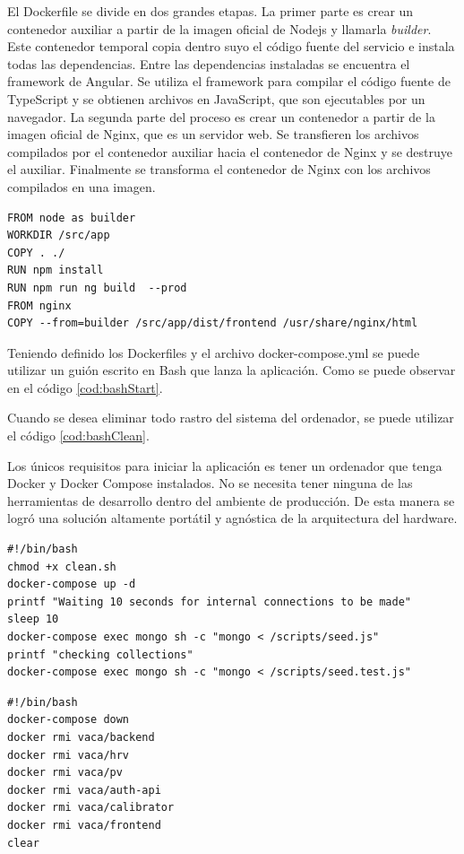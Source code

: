 El Dockerfile se divide en dos grandes etapas.
La primer parte es crear un contenedor auxiliar a partir de la imagen oficial de Nodejs y llamarla \emph{builder}.
Este contenedor temporal copia dentro suyo el código fuente del servicio e instala todas las dependencias.
Entre las dependencias instaladas se encuentra el framework de Angular.
Se utiliza el framework para compilar el código fuente de TypeScript y se obtienen archivos en JavaScript, que son ejecutables por un navegador.
La segunda parte del proceso es crear un contenedor a partir de la imagen oficial de Nginx, que es un servidor web.
Se transfieren los archivos compilados por el contenedor auxiliar hacia el contenedor de Nginx y se destruye el auxiliar.
Finalmente se transforma el contenedor de Nginx con los archivos compilados en una imagen.

\begin{lstlisting}[label=cod:dfFrontend,caption=Dockerfile del servicio Frontend.]
FROM node as builder
WORKDIR /src/app
COPY . ./
RUN npm install
RUN npm run ng build  --prod
FROM nginx
COPY --from=builder /src/app/dist/frontend /usr/share/nginx/html
\end{lstlisting}

Teniendo definido los Dockerfiles y el archivo docker-compose.yml se puede utilizar un guión escrito en Bash que lanza la aplicación.
Como se puede observar en el código \ref{cod:bashStart}.

Cuando se desea eliminar todo rastro del sistema del ordenador, se puede utilizar el código \ref{cod:bashClean}.

Los únicos requisitos para iniciar la aplicación es tener un ordenador que tenga Docker y Docker Compose instalados.
No se necesita tener ninguna de las herramientas de desarrollo dentro del ambiente de producción.
De esta manera se logró una solución altamente portátil y agnóstica de la arquitectura del hardware.

\begin{lstlisting}[label=cod:bashStart,caption=Guión de inicialización.]
#!/bin/bash
chmod +x clean.sh
docker-compose up -d
printf "Waiting 10 seconds for internal connections to be made"
sleep 10
docker-compose exec mongo sh -c "mongo < /scripts/seed.js"
printf "checking collections"
docker-compose exec mongo sh -c "mongo < /scripts/seed.test.js"
\end{lstlisting}

\begin{lstlisting}[label=cod:bashClean,caption=Guión de limpieza.]
#!/bin/bash
docker-compose down
docker rmi vaca/backend
docker rmi vaca/hrv
docker rmi vaca/pv
docker rmi vaca/auth-api
docker rmi vaca/calibrator
docker rmi vaca/frontend
clear
\end{lstlisting}

